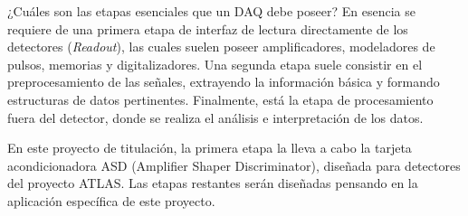 ¿Cuáles son las etapas esenciales que un DAQ debe poseer? En esencia se requiere de una primera etapa de interfaz de lectura directamente de los detectores (\textit{Readout}), las cuales suelen poseer amplificadores, modeladores de pulsos, memorias y digitalizadores. Una segunda etapa suele consistir en el preprocesamiento de las señales, extrayendo la información básica y formando estructuras de datos pertinentes. Finalmente, está la etapa de procesamiento fuera del detector, donde se realiza el análisis e interpretación de los datos.

En este proyecto de titulación, la primera etapa la lleva a cabo la tarjeta acondicionadora ASD (Amplifier Shaper Discriminator), diseñada para detectores del proyecto ATLAS. Las etapas restantes serán diseñadas pensando en la aplicación específica de este proyecto.

